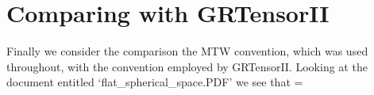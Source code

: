 \documentclass[12pt]{article}
\begin{document}
\section{Comparing with GRTensorII}

Finally we consider the comparison the MTW convention, which was used throughout,
with the convention employed by GRTensorII.  Looking at the document entitled
`flat\_spherical\_space.PDF' we see that
\bes
   =
   \eqp
\ees
\end{document}
